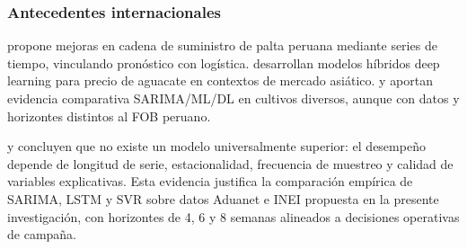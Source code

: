 


\subsubsection{Antecedentes internacionales}

\citet{Torres2022} propone mejoras en cadena de suministro de palta peruana mediante series de tiempo, vinculando pron\'ostico con log\'istica. \citet{Zhang2025} desarrollan modelos h\'ibridos deep learning para precio de aguacate en contextos de mercado asi\'atico. \citet{Kurnadipare2025} y \citet{Paul2022} aportan evidencia comparativa SARIMA/ML/DL en cultivos diversos, aunque con datos y horizontes distintos al FOB peruano.

\citet{Xia2024} y \citet{Theofilou2025} concluyen que no existe un modelo universalmente superior: el desempe\~no depende de longitud de serie, estacionalidad, frecuencia de muestreo y calidad de variables explicativas. Esta evidencia justifica la comparaci\'on emp\'irica de SARIMA, LSTM y SVR sobre datos Aduanet e INEI propuesta en la presente investigaci\'on, con horizontes de 4, 6 y 8 semanas alineados a decisiones operativas de campa\~na.
